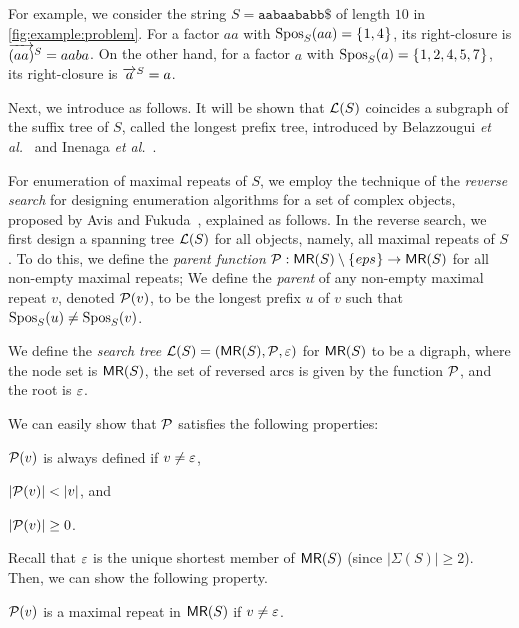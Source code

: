 For example, we consider the string  $S = \mathtt{aabaababb\$}$ of length $10$ in \cref{fig:example:problem}. For a factor $aa$ with $\mathrm{Spos}_{S}(aa) = \{\kern0.05em1, 4\kern0.05em\}$, its right-closure is $\overrightarrow{(aa)}^{S} = aaba$. On the other hand, for a factor $a$ with $\mathrm{Spos}_{S}(a) = \{\kern0.05em1,2,4,5,7\kern0.05em\}$, its right-closure is $\overrightarrow{a}^{S} = a$.

Next, we introduce  as follows. It will be shown that $\mathcal{L}(S)$ coincides a subgraph of the suffix tree of $S$, called the longest prefix tree, introduced by Belazzougui \textit{et al.}~\cite{belazzougui:nunial:gagie:prezza:raffinot2015composite} and Inenaga \textit{et al.}~\cite{inenaga:iwoca2024computing:maw}. 

For enumeration of maximal repeats of $S$, we employ the technique of the \textit{reverse search} for designing enumeration algorithms for a set of complex objects, proposed by Avis and Fukuda~\cite{avis1996reverse}, explained as follows.  In the reverse search, we first design a spanning tree $\mathcal{L}(S)$ for all objects, namely, all maximal repeats of $S$. To do this, we define the \textit{parent function} $\mathcal{P}: \textsf{MR}(S)\setminus\{\kern0.05emeps\kern0.05em\} \to \textsf{MR}(S)$ for all non-empty maximal repeats; We define the \textit{parent} of any non-empty maximal repeat $v$, denoted $\mathcal{P}(v)$, to be the longest prefix $u$ of $v$ such that $\mathrm{Spos}_{S}(u) \not= \mathrm{Spos}_{S}(v)$.

\begin{definition}\rm 
  We define the \textit{search tree} $\mathcal{L}(S) = (\textsf{MR}(S), \mathcal{P}, \varepsilon)$ for $\textsf{MR}(S)$ to be a digraph, where the node set is $\textsf{MR}(S)$, the set of reversed arcs is given by the function $\mathcal{P}$, and the root is $\varepsilon$. 
\end{definition}

We can easily show that $\mathcal{P}$ satisfies the following properties: 
\begin{enumerate*}[(i)]
\item $\mathcal{P}(v)$ is always defined if $v \not= \varepsilon$, 
\item $|\mathcal{P}(v)| < |v|$, and 
\item $|\mathcal{P}(v)| \ge 0$. 
\end{enumerate*}
Recall that $\varepsilon$ is the unique shortest member of $\textsf{MR}(S)$ (since $|\Sigma(S)|\ge 2$). Then, we can show the following property.

\begin{lemma}\label{lem:searchtree:parent:four}
$\mathcal{P}(v)$ is a maximal repeat in $\textsf{MR}(S)$ if $v\not=\varepsilon$. 
\end{lemma}

